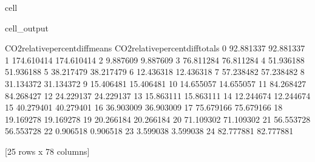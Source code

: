 \documentclass[letterpaper,10pt,english]{jupyterBook}
\begin{document}
\begin{sphinxuseclass}{cell}
\begin{sphinxVerbatimOutput}
\begin{sphinxuseclass}{cell_output}
\begin{sphinxVerbatim}[commandchars=\\\{\}]
    CO2\PYGZus{}relative\PYGZus{}percent\PYGZus{}diff\PYGZus{}means  CO2\PYGZus{}relative\PYGZus{}percent\PYGZus{}diff\PYGZus{}totals  
0                        \PYGZhy{}92.881337                        \PYGZhy{}92.881337  
1                       \PYGZhy{}174.610414                       \PYGZhy{}174.610414  
2                         \PYGZhy{}9.887609                         \PYGZhy{}9.887609  
3                         76.811284                         76.811284  
4                         51.936188                         51.936188  
5                        \PYGZhy{}38.217479                        \PYGZhy{}38.217479  
6                         12.436318                         12.436318  
7                         57.238482                         57.238482  
8                         31.134372                         31.134372  
9                        \PYGZhy{}15.406481                        \PYGZhy{}15.406481  
10                        14.655057                         14.655057  
11                        84.268427                         84.268427  
12                        24.229137                         24.229137  
13                       \PYGZhy{}15.863111                        \PYGZhy{}15.863111  
14                        12.244674                         12.244674  
15                        40.279401                         40.279401  
16                       \PYGZhy{}36.903009                        \PYGZhy{}36.903009  
17                        75.679166                         75.679166  
18                       \PYGZhy{}19.169278                        \PYGZhy{}19.169278  
19                        20.266184                         20.266184  
20                       \PYGZhy{}71.109302                        \PYGZhy{}71.109302  
21                        56.553728                         56.553728  
22                        \PYGZhy{}0.906518                         \PYGZhy{}0.906518  
23                         3.599038                          3.599038  
24                        82.777881                         82.777881  

[25 rows x 78 columns]
\end{sphinxVerbatim}

\end{sphinxuseclass}\end{sphinxVerbatimOutput}

\end{sphinxuseclass}
\end{document}
